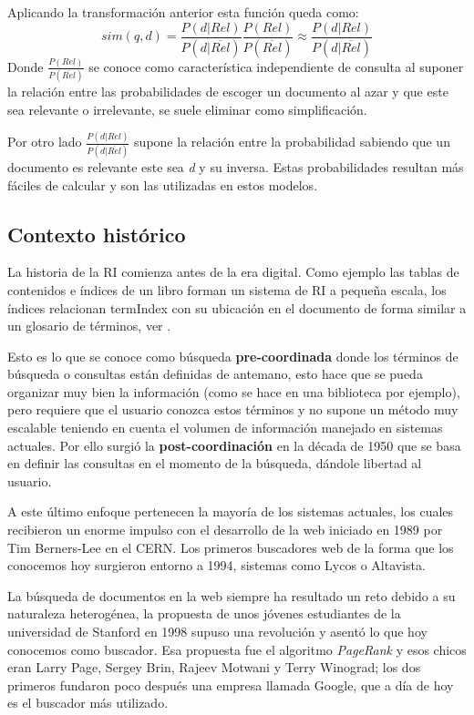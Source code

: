 \begin{list}{}{}
	Aplicando la transformación anterior esta función queda como:
	\begin{equation}
	sim(q,d) = \frac{P(d|Rel)}{P(d|\overline{Rel})}\frac{P(Rel)}{P(\overline{Rel})} \approx \frac{P(d|Rel)}{P(d|\overline{Rel})}
	\end{equation}
	Donde $\frac{P(Rel)}{P(\overline{Rel})}$ se conoce como característica independiente de consulta\label{modelProb} al suponer la relación entre las probabilidades de escoger un documento al azar y que este sea relevante o irrelevante, se suele eliminar como simplificación. 
	
	Por otro lado $\frac{P(d|Rel)}{P(d|\overline{Rel})}$ supone la relación entre la probabilidad sabiendo que un documento es relevante este sea \textit{d} y su inversa. Estas probabilidades resultan más fáciles de calcular y son las utilizadas en estos modelos.
	
	
\end{list}
\subsection{Contexto histórico}
La historia de la \acrshort{RI} comienza antes de la era digital. Como ejemplo las tablas de contenidos e índices de un libro forman un sistema de \acrshort{RI} a pequeña escala, los índices relacionan \gls{termIndex} con su ubicación en el documento de forma similar a un glosario de términos, ver  .

Esto es lo que se conoce como búsqueda \textbf{pre-coordinada} donde los términos de búsqueda o consultas están definidas de antemano, esto hace que se pueda organizar muy bien la información (como se hace en una biblioteca por ejemplo), pero requiere que el usuario conozca estos términos y no supone un método muy escalable teniendo en cuenta el volumen de información manejado en sistemas actuales. Por ello surgió la \textbf{post-coordinación} en la década de 1950 que se basa en definir las consultas en el momento de la búsqueda, dándole libertad al usuario.

A este último enfoque pertenecen la mayoría de los sistemas actuales, los cuales recibieron un enorme impulso con el desarrollo de la web iniciado en 1989 por Tim Berners-Lee en el CERN. Los primeros buscadores web de la forma que los conocemos hoy surgieron entorno a 1994, sistemas como Lycos o Altavista. 

La búsqueda de documentos en la web siempre ha resultado un reto debido a su naturaleza heterogénea, la propuesta de unos jóvenes estudiantes de la universidad de Stanford en 1998 supuso una revolución y asentó lo que hoy conocemos como buscador. Esa propuesta fue el algoritmo \textit{PageRank}\cite{PageRankPaper} y esos chicos eran Larry Page, Sergey Brin, Rajeev Motwani y Terry Winograd; los dos primeros fundaron poco después una empresa llamada Google, que a día de hoy es el buscador más utilizado. \cite{searchEngineShare}

